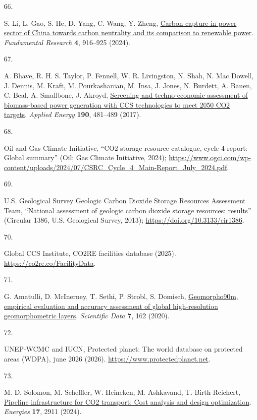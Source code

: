 \documentclass[
  letterpaper,
]{article}
\newlength{\cslhangindent}
\newlength{\csllabelwidth}
\newenvironment{CSLReferences}[2] %
 {\begin{list}{}{%
  \setlength{\itemindent}{0pt}
  \setlength{\leftmargin}{0pt}
  \setlength{\parsep}{0pt}
  \ifodd #1
   \setlength{\leftmargin}{\cslhangindent}
   \setlength{\itemindent}{-1\cslhangindent}
  \fi
  \setlength{\itemsep}{#2\baselineskip}}}
 {\end{list}}
\newcommand{\CSLLeftMargin}[1]{\parbox[t]{\csllabelwidth}{\strut#1\strut}}
\newcommand{\CSLRightInline}[1]{\parbox[t]{\linewidth - \csllabelwidth}{\strut#1\strut}}
\begin{document}
\begin{CSLReferences}{0}{1}
\CSLLeftMargin{66. }%
\CSLRightInline{S. Li, L. Gao, S. He, D. Yang, C. Wang, Y. Zheng,
\href{https://doi.org/10.1016/j.fmre.2022.05.027}{Carbon capture in
power sector of {China} towards carbon neutrality and its comparison to
renewable power}. \emph{Fundamental Research} \textbf{4}, 916--925
(2024).}

\CSLLeftMargin{67. }%
\CSLRightInline{A. Bhave, R. H. S. Taylor, P. Fennell, W. R. Livingston,
N. Shah, N. Mac Dowell, J. Dennis, M. Kraft, M. Pourkashanian, M. Insa,
J. Jones, N. Burdett, A. Bauen, C. Beal, A. Smallbone, J. Akroyd,
\href{https://doi.org/10.1016/j.apenergy.2016.12.120}{Screening and
techno-economic assessment of biomass-based power generation with {CCS}
technologies to meet 2050 {CO2} targets}. \emph{Applied Energy}
\textbf{190}, 481--489 (2017).}

\CSLLeftMargin{68. }%
\CSLRightInline{Oil and Gas Climate Initiative, {``{CO2} storage
resource catalogue, cycle 4 report: Global summary''} (Oil; Gas Climate
Initiative, 2024);
\url{https://www.ogci.com/wp-content/uploads/2024/07/CSRC_Cycle_4_Main-Report_July_2024.pdf}.}

\CSLLeftMargin{69. }%
\CSLRightInline{U.S. Geological Survey Geologic Carbon Dioxide Storage
Resources Assessment Team, {``National assessment of geologic carbon
dioxide storage resources: results''} (Circular 1386, U.S. Geological
Survey, 2013); \url{https://doi.org/10.3133/cir1386}.}

\CSLLeftMargin{70. }%
\CSLRightInline{Global CCS Institute, {CO2RE} facilities database
(2025). \url{https://co2re.co/FacilityData}.}

\CSLLeftMargin{71. }%
\CSLRightInline{G. Amatulli, D. McInerney, T. Sethi, P. Strobl, S.
Domisch, \href{https://doi.org/10.1038/s41597-020-0479-6}{Geomorpho90m,
empirical evaluation and accuracy assessment of global high-resolution
geomorphometric layers}. \emph{Scientific Data} \textbf{7}, 162 (2020).}

\CSLLeftMargin{72. }%
\CSLRightInline{UNEP-WCMC and IUCN, Protected planet: The world database
on protected areas ({WDPA}), june 2026 (2026).
\url{https://www.protectedplanet.net}.}

\CSLLeftMargin{73. }%
\CSLRightInline{M. D. Solomon, M. Scheffler, W. Heineken, M. Ashkavand,
T. Birth-Reichert, \href{https://doi.org/10.3390/en17122911}{Pipeline
infrastructure for {CO2} transport: Cost analysis and design
optimization}. \emph{Energies} \textbf{17}, 2911 (2024).}


\end{CSLReferences}
\end{document}
